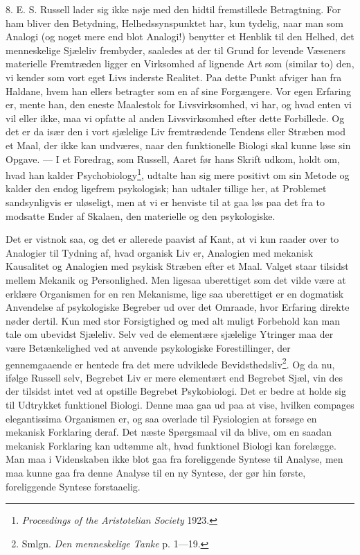 \documentclass[12pt]{article}
\newcommand{\opage}[1]{\marginnote{\footnotesize\textit{[#1]}}}
\begin{document}
8. E. S. Russell lader sig ikke nøje med den hidtil fremstillede
Betragtning. For ham bliver den Betydning, Helhedssynspunktet har, kun
tydelig, naar man som Analogi (og noget mere end blot Analogi!)
benytter et Henblik til den Helhed, det menneskelige Sjæleliv
frembyder, \guillemotright{}saaledes at der til Grund for levende
Væseners materielle Fremtræden ligger en Virksomhed af lignende Art som
(similar to) den, vi kender som vort eget Livs inderste
\setcounter{footnote}{0}%
\opage{28}Realitet.\guillemotleft{} Paa dette Punkt afviger han fra
Haldane, hvem han ellers betragter som en af sine Forgængere. Vor egen
Erfaring er, mente han, den eneste Maalestok for Livsvirksomhed, vi
har, og hvad enten vi vil eller ikke, maa vi opfatte al anden
Livsvirksomhed efter dette Forbillede. Og det er da især den i vort
sjælelige Liv fremtrædende Tendens eller Stræben mod et Maal, der ikke
kan undværes, naar den funktionelle Biologi skal kunne løse sin Opgave.
--- I et Foredrag, som Russell, Aaret før hans Skrift udkom, holdt om,
hvad han kalder \guillemotright{}Psychobiology\guillemotleft{}\footnote{\textit{Proceedings
of the Aristotelian Society} 1923.}, udtalte han sig mere positivt om
sin Metode og kalder den endog ligefrem psykologisk; han udtaler
tillige her, at Problemet sandsynligvis er uløseligt, men at vi er
henviste til at gaa løs paa det fra to modsatte Ender af Skalaen, den
materielle og den psykologiske.

Det er vistnok saa, og det er allerede paavist af Kant, at vi kun
raader over to Analogier til Tydning af, hvad organisk Liv er,
Analogien med mekanisk Kausalitet og Analogien med psykisk Stræben
efter et Maal. Valget staar tilsidst mellem Mekanik og Personlighed.
Men ligesaa uberettiget som det vilde være at erklære Organismen for en
ren Mekanisme, lige saa uberettiget er en dogmatisk Anvendelse af
psykologiske Begreber ud over det Omraade, hvor Erfaring direkte nøder
dertil. Kun med stor Forsigtighed og med alt muligt Forbehold kan man
tale om ubevidst Sjæleliv. Selv ved de elementære sjælelige Ytringer
maa der være Betænkelighed ved at anvende psykologiske Forestillinger,
der gennemgaaende er hentede fra det mere udviklede
Bevidsthedsliv\footnote{Smlgn. \textit{Den menneskelige Tanke} p.
1---19.}. Og da nu, ifølge Russell selv, Begrebet Liv er mere
elementært end Begrebet Sjæl, vin%
\opage{29}des der tilsidst intet ved at opstille Begrebet
\guillemotright{}Psykobiologi\guillemotleft{}. Det er bedre at holde sig til Udtrykket
\guillemotright{}funktionel Biologi\guillemotleft{}. Denne maa gaa ud paa at vise, hvilken
\guillemotright{}compages elegantissima\guillemotleft{} Organismen er, og saa overlade til
Fysiologien at forsøge en mekanisk Forklaring deraf. Det næste
Spørgsmaal vil da blive, om en saadan mekanisk Forklaring kan udtømme
alt, hvad funktionel Biologi kan forelægge. Man maa i Videnskaben ikke
blot gaa fra foreliggende Syntese til Analyse, men maa kunne gaa fra
denne Analyse til en ny Syntese, der gør hin første, foreliggende
Syntese forstaaelig.
\end{document}

